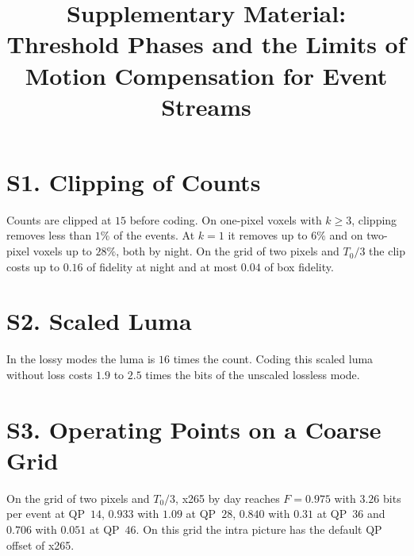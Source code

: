 \documentclass[journal,onecolumn]{IEEEtran}
\begin{document}
\title{Supplementary Material: Threshold Phases and the Limits of Motion Compensation for Event Streams}
\maketitle

\section*{S1. Clipping of Counts}
Counts are clipped at $15$ before coding. On one-pixel voxels with $k\ge3$, clipping removes less than
$1\%$ of the events. At $k=1$ it removes up to $6\%$ and on two-pixel voxels up to $28\%$, both by
night. On the grid of two pixels and $T_0/3$ the clip costs up to $0.16$ of fidelity at night and at
most $0.04$ of box fidelity.

\section*{S2. Scaled Luma}
In the lossy modes the luma is $16$ times the count. Coding this scaled luma without loss costs $1.9$
to $2.5$ times the bits of the unscaled lossless mode.

\section*{S3. Operating Points on a Coarse Grid}
On the grid of two pixels and $T_0/3$, x265 by day reaches $F=0.975$ with $3.26$ bits per event at
QP~$14$, $0.933$ with $1.09$ at QP~$28$, $0.840$ with $0.31$ at QP~$36$ and $0.706$ with $0.051$ at
QP~$46$. On this grid the intra picture has the default QP offset of x265.
\end{document}
